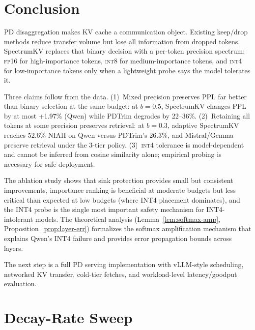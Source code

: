 \documentclass[11pt]{article}
\newcommand{\method}{SpectrumKV}
\newcommand{\budget}{b}
\newcommand{\pct}{\%}
\newcommand{\fp}{\textsc{fp16}}
\newcommand{\intviii}{\textsc{int8}}
\newcommand{\intiv}{\textsc{int4}}
\theoremstyle{plain}
\theoremstyle{definition}
\begin{document}
\section{Conclusion}
\label{sec:conclusion}

PD disaggregation makes KV cache a communication object.  Existing keep/drop methods reduce transfer volume but lose all information from dropped tokens.  \method{} replaces that binary decision with a per-token precision spectrum: \fp{} for high-importance tokens, \intviii{} for medium-importance tokens, and \intiv{} for low-importance tokens only when a lightweight probe says the model tolerates it.

Three claims follow from the data.  (1)~Mixed precision preserves PPL far better than binary selection at the same budget: at $\budget=0.5$, \method{} changes PPL by at most +1.97\pct{} (Qwen) while PDTrim degrades by 22--36\pct{}.  (2)~Retaining all tokens at some precision preserves retrieval: at $\budget=0.3$, adaptive \method{} reaches 52.6\pct{} NIAH on Qwen versus PDTrim's 26.3\pct{}, and Mistral/Gemma preserve retrieval under the 3-tier policy.  (3)~\intiv{} tolerance is model-dependent and cannot be inferred from cosine similarity alone; empirical probing is necessary for safe deployment.

The ablation study shows that sink protection provides small but consistent improvements, importance ranking is beneficial at moderate budgets but less critical than expected at low budgets (where INT4 placement dominates), and the INT4 probe is the single most important safety mechanism for INT4-intolerant models.  The theoretical analysis (Lemma~\ref{lem:softmax-amp}, Proposition~\ref{prop:layer-err}) formalizes the softmax amplification mechanism that explains Qwen's INT4 failure and provides error propagation bounds across layers.

The next step is a full PD serving implementation with vLLM-style scheduling, networked KV transfer, cold-tier fetches, and workload-level latency/goodput evaluation.

\appendix

\section{Decay-Rate Sweep}
\label{app:decay}
\end{document}
